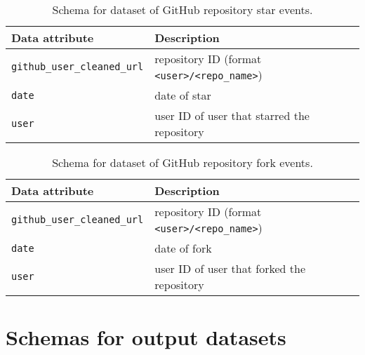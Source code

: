 \documentclass[10pt,a4paper]{scrartcl}
\begin{document}
\begin{table}
    \centering
    \begin{tabular}{l|l}
        \hline
        Data attribute & Description \\
        \hline
        \verb|github_user_cleaned_url| & repository ID (format \verb|<user>/<repo_name>|) \\
        \verb|date| & date of star \\
        \verb|user| & user ID of user that starred the repository \\
        \hline
    \end{tabular}
    \caption{Schema for dataset of GitHub repository star events.}
    \label{table:stars}
\end{table}

\begin{table}
    \centering
    \begin{tabular}{l|l}
        \hline
        Data attribute & Description \\
        \hline
        \verb|github_user_cleaned_url| & repository ID (format \verb|<user>/<repo_name>|) \\
        \verb|date| & date of fork \\
        \verb|user| & user ID of user that forked the repository \\
        \hline
    \end{tabular}
    \caption{Schema for dataset of GitHub repository fork events.}
    \label{table:forks}
\end{table}

\section{Schemas for output datasets}
\label{section:app_schemas_output}

\end{document}
